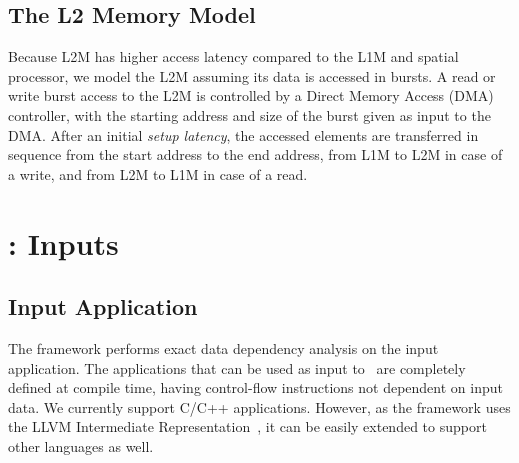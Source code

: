 

\vspace{-1mm}
\subsection{The L2 Memory Model}
\label{ssec:layer2_model}
\vspace{-1mm}
Because L2M has higher access latency compared to the L1M and spatial processor, we model the L2M assuming its data is accessed in bursts.
A read or write burst access to the L2M is controlled by a Direct Memory Access (DMA) controller, with the starting address and size of the burst given as input to the DMA. After an initial \textit{setup latency}, the accessed elements are transferred in sequence from the start address to the end address, from L1M to L2M in case of a write, and from L2M to L1M in case of a read.

\section{\frameworkname: Inputs}
\vspace{-1mm}
\subsection{Input Application}
\label{ssec:app}
\vspace{-1mm}
The framework performs exact data dependency analysis on the input application. The applications that can be used as input to \frameworkname~are completely defined at compile time, having control-flow instructions not dependent on input data. We currently support C/C++ applications. However, as the framework uses the LLVM Intermediate Representation~\cite{llvm}, it can be easily extended to support other languages as well.


